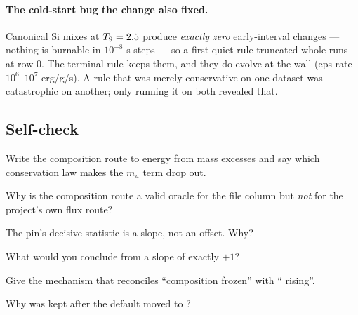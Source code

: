 \paragraph{The cold-start bug the change also fixed.} Canonical Si mixes at
$T_{9} = 2.5$ produce \emph{exactly zero} early-interval changes --- nothing is
burnable in $10^{-8}$-s steps --- so a first-quiet rule truncated whole runs at
row 0. The terminal rule keeps them, and they do evolve at the wall (eps rate
$10^{6}$--$10^{7}$ erg/g/s).  A rule that was merely
conservative on one dataset was catastrophic on another; only running it on
both revealed that.

\subsection{Self-check}
\label{sec:selfcheck-trajectories}

\begin{selfcheck}
\item Write the composition route to energy from mass excesses and say which
  conservation law makes the $m_u$ term drop out.
\item Why is the composition route a valid oracle for the file column but
  \emph{not} for the project's own flux route?
\item The pin's decisive statistic is a slope, not an offset. Why?
\item What would you conclude from a slope of exactly $+1$?
\item Give the mechanism that reconciles ``composition frozen'' with
  `` rising''.
\item Why was  kept after the default moved to
  ?
\end{selfcheck}
